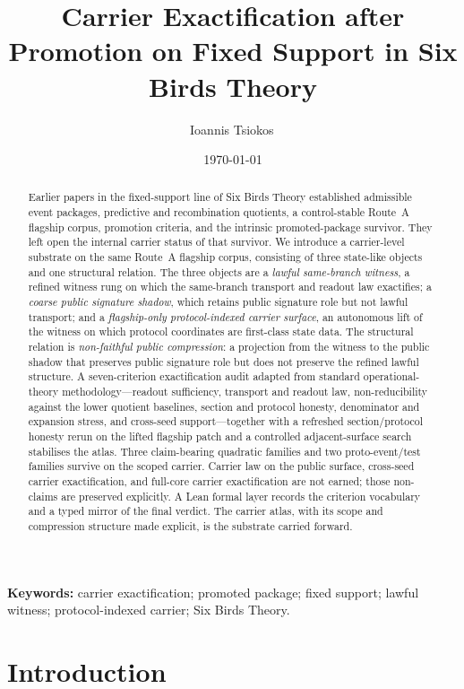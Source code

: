 \documentclass[11pt]{article}
\title{Carrier Exactification after Promotion on Fixed Support in Six Birds Theory}
\author{Ioannis Tsiokos\,\orcidlink{0009-0009-7659-5964}}
\date{\today}
\theoremstyle{definition}
\begin{document}
\maketitle
\thispagestyle{firstpage}

\begin{abstract}
Earlier papers in the fixed-support line of Six Birds Theory established admissible event packages, predictive and recombination quotients, a control-stable Route~A flagship corpus, promotion criteria, and the intrinsic promoted-package survivor. They left open the internal carrier status of that survivor. We introduce a carrier-level substrate on the same Route~A flagship corpus, consisting of three state-like objects and one structural relation. The three objects are a \emph{lawful same-branch witness}, a refined witness rung on which the same-branch transport and readout law exactifies; a \emph{coarse public signature shadow}, which retains public signature role but not lawful transport; and a \emph{flagship-only protocol-indexed carrier surface}, an autonomous lift of the witness on which protocol coordinates are first-class state data. The structural relation is \emph{non-faithful public compression}: a projection from the witness to the public shadow that preserves public signature role but does not preserve the refined lawful structure. A seven-criterion exactification audit adapted from standard operational-theory methodology---readout sufficiency, transport and readout law, non-reducibility against the lower quotient baselines, section and protocol honesty, denominator and expansion stress, and cross-seed support---together with a refreshed section/protocol honesty rerun on the lifted flagship patch and a controlled adjacent-surface search stabilises the atlas. Three claim-bearing quadratic families and two proto-event/test families survive on the scoped carrier. Carrier law on the public surface, cross-seed carrier exactification, and full-core carrier exactification are not earned; those non-claims are preserved explicitly. A Lean formal layer records the criterion vocabulary and a typed mirror of the final verdict. The carrier atlas, with its scope and compression structure made explicit, is the substrate carried forward.
\end{abstract}

\medskip
\noindent\textbf{Keywords:} carrier exactification; promoted package; fixed support; lawful witness; protocol-indexed carrier; Six Birds Theory.

\section{Introduction}
\label{sec:introduction}
\end{document}

